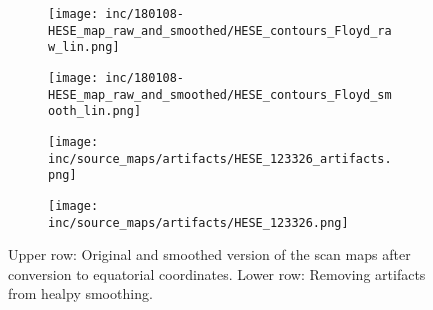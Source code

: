 \begin{figure}[htbp] %
  \centering
  \begin{subfigure}[c]{0.49\textwidth}
    \texttt{[image: inc/180108-HESE\_map\_raw\_and\_smoothed/HESE\_contours\_Floyd\_raw\_lin.png]}
  \end{subfigure}
  \hfill
  \begin{subfigure}[c]{0.49\textwidth}
    \texttt{[image: inc/180108-HESE\_map\_raw\_and\_smoothed/HESE\_contours\_Floyd\_smooth\_lin.png]}
  \end{subfigure}

  \begin{subfigure}[c]{0.49\textwidth}
    \texttt{[image: inc/source\_maps/artifacts/HESE\_123326\_artifacts.png]}
  \end{subfigure}
  \hfill
  \begin{subfigure}[c]{0.49\textwidth}
    \texttt{[image: inc/source\_maps/artifacts/HESE\_123326.png]}
  \end{subfigure}

  \caption{Upper row: Original and smoothed version of the scan maps after conversion to equatorial coordinates. Lower row: Removing artifacts from healpy smoothing.}
  \label{fig:source_map_handling}
\end{figure}


